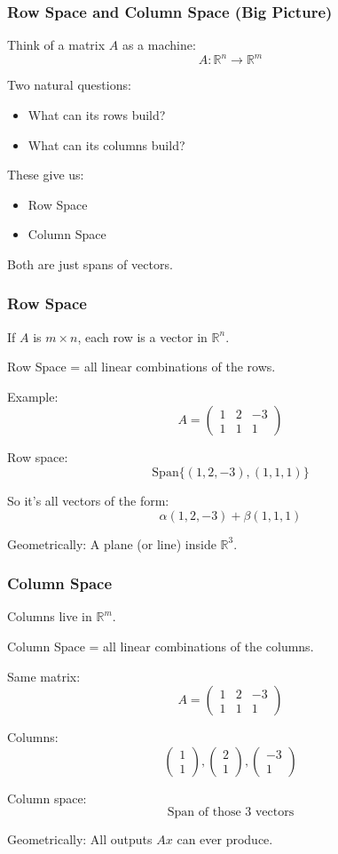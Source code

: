 \documentclass{beamer}
\begin{document}
\begin{frame}
\frametitle{Row Space and Column Space (Big Picture)}

Think of a matrix $A$ as a machine:
\[
A : \mathbb{R}^n \to \mathbb{R}^m
\]

Two natural questions:
\begin{itemize}
    \item What can its rows build?
    \item What can its columns build?
\end{itemize}

These give us:
\begin{itemize}
    \item Row Space
    \item Column Space
\end{itemize}

Both are just spans of vectors.
\end{frame}

\begin{frame}
\frametitle{Row Space}

If $A$ is $m \times n$, each row is a vector in $\mathbb{R}^n$.

Row Space = all linear combinations of the rows.

Example:
\[
A =
\begin{pmatrix}
1 & 2 & -3 \\
1 & 1 & 1
\end{pmatrix}
\]

Row space:
\[
\text{Span}\{(1,2,-3), (1,1,1)\}
\]

So it's all vectors of the form:
\[
\alpha(1,2,-3) + \beta(1,1,1)
\]

Geometrically:
A plane (or line) inside $\mathbb{R}^3$.
\end{frame}

\begin{frame}
\frametitle{Column Space}

Columns live in $\mathbb{R}^m$.

Column Space = all linear combinations of the columns.

Same matrix:
\[
A =
\begin{pmatrix}
1 & 2 & -3 \\
1 & 1 & 1
\end{pmatrix}
\]

Columns:
\[
\begin{pmatrix}1\\1\end{pmatrix},
\begin{pmatrix}2\\1\end{pmatrix},
\begin{pmatrix}-3\\1\end{pmatrix}
\]

Column space:
\[
\text{Span of those 3 vectors}
\]

Geometrically:
All outputs $Ax$ can ever produce.
\end{frame}
\end{document}

